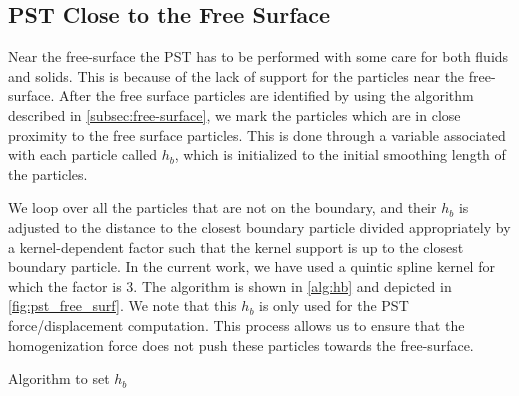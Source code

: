 \subsection{PST Close to the Free Surface}
\label{sec:pst-free-surf}

Near the free-surface the PST has to be performed with some care for both
fluids and solids. This is because of the lack of support for the particles
near the free-surface. After the free surface particles are identified by
using the algorithm described in \cref{subsec:free-surface}, we mark the
particles which are in close proximity to the free surface particles. This is
done through a variable associated with each particle called $h_{b}$, which is
initialized to the initial smoothing length of the particles.

We loop over all the particles that are not on the boundary, and their $h_b$
is adjusted to the distance to the closest boundary particle divided
appropriately by a kernel-dependent factor such that the kernel support is up
to the closest boundary particle. In the current work, we have used a quintic
spline kernel for which the factor is 3. The algorithm is shown in
\cref{alg:hb} and depicted in \cref{fig:pst_free_surf}. We note that this
$h_b$ is only used for the PST force/displacement computation. This process
allows us to ensure that the homogenization force does not push these
particles towards the free-surface.
%
\begin{algorithm}[!ht]
  \caption{Algorithm to set $h_b$}%
  \label{alg:hb}
  \begin{algorithmic}[1]
    \Else
    \EndIf
    \EndFor%
    \EndIf
    \EndFor%
  \end{algorithmic}
\end{algorithm}
%


